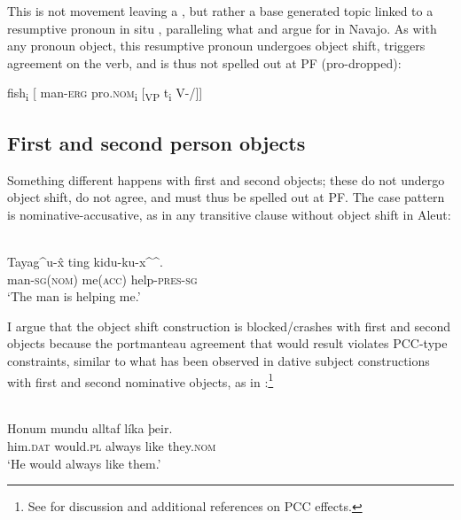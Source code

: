 \documentclass[output=paper]{LSP/langsci}
\begin{document}
This is not movement leaving a , but rather a base generated topic linked to a resumptive pronoun in situ \citep{boyle2000aleut}, paralleling what \citet{Willie1991} and \citet{Speas1990} argue for in Navajo. As with any pronoun object, this resumptive pronoun undergoes object shift, triggers agreement on the verb, and is thus not spelled out at PF (pro-dropped):

\ea\label{ex:woolford:24}
fish\textsubscript{i}  [ man-\textsc{erg}  pro.\textsc{nom}\textsubscript{i  }[\textsubscript{VP} t\textsubscript{i  }V-/]]
\z

\subsection{First and second person objects }

Something different happens with first and second  objects; these do not undergo object shift, do not agree, and must thus be spelled out at PF. The case pattern is nominative-accusative, as in any transitive clause without object shift in Aleut: 

 
\ea\label{ex:woolford:25}
\\
\gll Tayag\^{ }u-\^{x} ting   kidu-ku-x\^{}\^{}.\\
     man-\textsc{sg}(\textsc{nom})    me(\textsc{acc})  help-\textsc{pres}-\textsc{sg}     \\
\glt ‘The man is helping me.’ 
\z

I argue that the object shift construction is blocked/crashes with first and second  objects because the portmanteau agreement that would result violates PCC-type constraints, similar to what has been observed in  dative subject constructions with first and second  nominative objects, as in \citealt{Sigurðsson1996,sigurdhsson2004icelandic}:\footnote{See \citet{anagnostopoulou2005strong} for discussion and additional references on PCC effects.} 

\ea\label{ex:woolford:26}
\\
\gll Honum    mundu  alltaf    líka  þeir.         \\
     him.\textsc{dat}  would.\textsc{pl}  always  like  they.\textsc{nom}\\
\glt ‘He would always like them.’
\z
\end{document}
